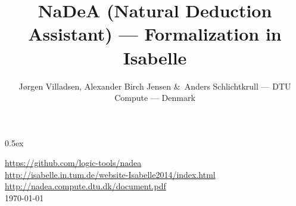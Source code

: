 \documentclass[11pt,a4paper]{article}
\begin{document}
\title{NaDeA (Natural Deduction Assistant) --- Formalization in Isabelle}

\author{J{\o}rgen Villadsen, Alexander Birch Jensen \&\ Anders Schlichtkrull --- DTU Compute --- Denmark}

\date{}

\maketitle


\parindent 0pt\parskip 0.5ex



%
%

\vfill

\begin{center}
\url{https://github.com/logic-tools/nadea} \\[1ex]
\url{http://isabelle.in.tum.de/website-Isabelle2014/index.html} \\[1ex]
\url{http://nadea.compute.dtu.dk/document.pdf} \\[1ex]
\mydate\today
\end{center}
\end{document}
